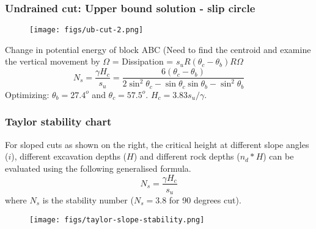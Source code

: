 \documentclass[handout]{beamer}
\begin{document}
\begin{frame}
	\frametitle{Undrained cut: Upper bound solution - slip circle}
	\begin{figure}
		\texttt{[image: figs/ub-cut-2.png]}
	\end{figure}

	Change in potential energy of block ABC (Need to find the centroid and examine the
vertical movement by $\Omega$ = Dissipation = $s_u R (\theta_c - \theta_b) R \Omega$
	\begin{equation*}
	N_s = \frac{\gamma H_c}{s_u} = \frac{6 (\theta_c - \theta_b)}{2 \sin^2 \theta_c - \sin \theta_c \sin \theta_b - \sin^2\theta_b}
	\end{equation*}
	Optimizing: $\theta_b = 27.4^o$ and $\theta_c=57.5^o$. 
	$H_c = 3.83 s_u / \gamma$.
\end{frame}



\begin{frame}
	\frametitle{Taylor stability chart}
		\noindent
	\fboxsep=0pt
	\noindent
	\begin{minipage}[t]{0.5\linewidth}
		For sloped cuts as shown on the right, the critical height at different
slope
angles
($i$), different
		excavation depths ($H$) and
different rock depths ($n_d * H$) can
be evaluated using the following
		generalised formula.
		\begin{equation*}
			N_s = \frac{\gamma H_c}{s_u}		
		\end{equation*}
		where $N_s$ is the stability number
($N_s = 3.8$ for 90 degrees cut).
	\end{minipage}%
	\hfill
	\begin{minipage}[t]{0.5\linewidth}
	\begin{figure}
		\texttt{[image: figs/taylor-slope-stability.png]}
	\end{figure}

	\end{minipage}

\end{frame}
\end{document}
